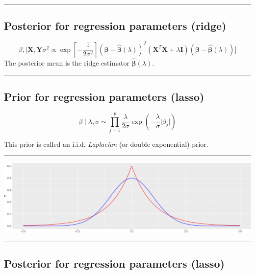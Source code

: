 \documentclass[
  letterpaper,
  DIV=11,
  numbers=noendperiod]{scrartcl}
\begin{document}
\begin{center}\rule{0.5\linewidth}{0.5pt}\end{center}

\hypertarget{posterior-for-regression-parameters-ridge}{%
\subsection{Posterior for regression parameters
(ridge)}\label{posterior-for-regression-parameters-ridge}}

\[ \beta, \mid \boldsymbol X, \boldsymbol Y \sigma^2 \propto \exp[-\frac{1}{2\sigma^2}](\boldsymbol \beta-\hat{\boldsymbol \beta}({\lambda}))^T ({\boldsymbol X}^T \boldsymbol X+\lambda \boldsymbol I)(\boldsymbol \beta-\hat{\boldsymbol \beta}({\lambda}))]\]
The posterior mean is the ridge estimator
\(\hat{\boldsymbol \beta}(\lambda)\).

\begin{center}\rule{0.5\linewidth}{0.5pt}\end{center}

\hypertarget{prior-for-regression-parameters-lasso}{%
\subsection{Prior for regression parameters
(lasso)}\label{prior-for-regression-parameters-lasso}}

\[\beta \mid \lambda, \sigma \sim \prod_{j=1}^p \frac{\lambda}{2 \sigma}\exp(-\frac{\lambda}{\sigma}\lvert \beta_j \rvert)\]

This prior is called an i.i.d. \emph{Laplacian} (or double exponential)
prior.

\begin{center}\rule{0.5\linewidth}{0.5pt}\end{center}

\includegraphics{W6_files/figure-pdf/unnamed-chunk-7-1.pdf}

\begin{center}\rule{0.5\linewidth}{0.5pt}\end{center}

\hypertarget{posterior-for-regression-parameters-lasso}{%
\subsection{Posterior for regression parameters
(lasso)}\label{posterior-for-regression-parameters-lasso}}
\end{document}
